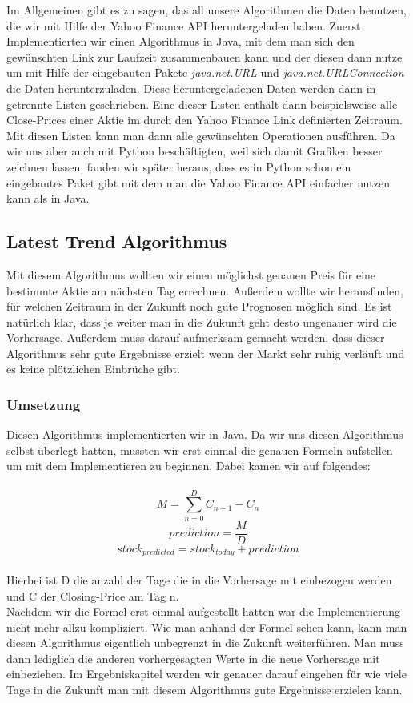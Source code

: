 \documentclass[12pt]{article} %
\begin{document}
Im Allgemeinen gibt es zu sagen, das all unsere Algorithmen die Daten benutzen, die wir mit Hilfe der Yahoo Finance API heruntergeladen haben. Zuerst Implementierten wir einen Algorithmus in Java, mit dem man sich den gewünschten Link zur Laufzeit zusammenbauen kann und der diesen dann nutze um mit Hilfe der eingebauten Pakete \textit{java.net.URL} und \textit{java.net.URLConnection} die Daten herunterzuladen. Diese heruntergeladenen Daten werden dann in getrennte Listen geschrieben. Eine dieser Listen enthält dann beispielsweise alle Close-Prices einer Aktie im durch den Yahoo Finance Link definierten Zeitraum. Mit diesen Listen kann man dann alle gewünschten Operationen ausführen. Da wir uns aber auch mit Python beschäftigten, weil sich damit Grafiken besser zeichnen lassen, fanden wir später heraus, dass es in Python schon ein eingebautes Paket gibt mit dem man die Yahoo Finance API einfacher nutzen kann als in Java.

\subsection{Latest Trend Algorithmus} %

Mit diesem Algorithmus wollten wir einen möglichst genauen Preis für eine bestimmte Aktie am nächsten Tag errechnen. Außerdem wollte wir herausfinden, für welchen Zeitraum in der Zukunft noch gute Prognosen möglich sind. Es ist natürlich klar, dass je weiter man in die Zukunft geht desto ungenauer wird die Vorhersage. Außerdem muss darauf aufmerksam gemacht werden, dass dieser Algorithmus sehr gute Ergebnisse erzielt wenn der Markt sehr ruhig verläuft und es keine plötzlichen Einbrüche gibt. 

\subsubsection{Umsetzung}
Diesen Algorithmus implementierten wir in Java. Da wir uns diesen Algorithmus selbst überlegt hatten, mussten wir erst einmal die genauen Formeln aufstellen um mit dem Implementieren zu beginnen. Dabei kamen wir auf folgendes:
\\
\\
\[ M = \sum_{n=0}^D C_{n+1} - C_{n} \]
\[ prediction = \frac{M}{D}\]
\[ stock_{predicted} = stock_{today} + prediction\]
\\
Hierbei ist D die anzahl der Tage die in die Vorhersage mit einbezogen werden und C der Closing-Price am Tag n.
\\
Nachdem wir die Formel erst einmal aufgestellt hatten war die Implementierung nicht mehr allzu kompliziert.
Wie man anhand der Formel sehen kann, kann man diesen Algorithmus eigentlich unbegrenzt in die Zukunft weiterführen. Man muss dann lediglich die anderen vorhergesagten Werte in die neue Vorhersage mit einbeziehen. Im Ergebniskapitel werden wir genauer darauf eingehen für wie viele Tage in die Zukunft man mit diesem Algorithmus gute Ergebnisse erzielen kann.
\end{document}
